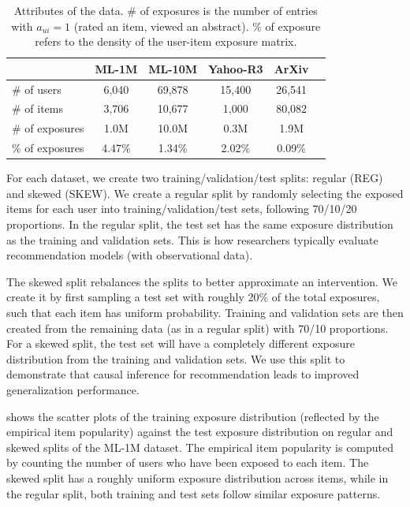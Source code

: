 \begin{table}
\begin{center}
\begin{tabular}{ l c c c c c }
  \toprule
   & \textbf{ML-1M} & \textbf{ML-10M} & \textbf{Yahoo-R3} & \textbf{ArXiv}  \\
  \midrule
  \# of users & 6,040 & 69,878 & 15,400 & 26,541  \\
  \# of items & 3,706 & 10,677 & 1,000 & 80,082 \\
  \# of exposures & 1.0M &  10.0M & 0.3M & 1.9M \\
  \% of exposures & 4.47\% & 1.34\% & 2.02\% & 0.09\% \\
  \bottomrule
\end{tabular}
\end{center}
\caption{Attributes of the data. \# of exposures is the
  number of entries with $a_{ui} = 1$ (rated an item, viewed an abstract). \% of exposure refers to the
  density of the user-item exposure matrix. }
\label{tab:data}
\end{table}

 For each dataset, we create two
training/validation/test splits: regular (REG) and skewed (SKEW). We
create a regular split by randomly selecting the exposed items for
each user into training/validation/test sets, following 70/10/20
proportions. In the regular split, the test set has the same exposure
distribution as the training and validation sets. This is how
researchers typically evaluate recommendation models (with
observational data).

The skewed split rebalances the splits to better approximate an
intervention. We create it by first sampling a test set with roughly
20\% of the total exposures, such that each item has uniform
probability. Training and validation sets are then created from the
remaining data (as in a regular split) with 70/10 proportions. For a
skewed split, the test set will have a completely different exposure
distribution from the training and validation sets. We use this split
to demonstrate that causal inference for recommendation leads to
improved generalization performance.

 shows the scatter plots of the training exposure
distribution (reflected by the empirical item popularity) against the
test exposure distribution on regular and skewed splits of the ML-1M
dataset. The empirical item popularity is computed by counting the
number of users who have been exposed to each item. The skewed split
has a roughly uniform exposure distribution across items, while in the
regular split, both training and test sets follow similar exposure
patterns.


